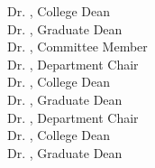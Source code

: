 \begin{titlepage}
Dr. \colldean, College Dean\\
Dr. \graddean, Graduate Dean\\
\else
\ifdefined\commema
Dr. \commema, Committee Member\\
Dr. \depchair, Department Chair\\
Dr. \colldean, College Dean\\
Dr. \graddean, Graduate Dean\\
\else
Dr. \depchair, Department Chair\\
Dr. \colldean, College Dean\\
Dr. \graddean, Graduate Dean\\
\fi
\fi
\fi
\fi
\fi
\fi
\fi
\fi
\fi
\end{titlepage}

\newpage
\restoregeometry